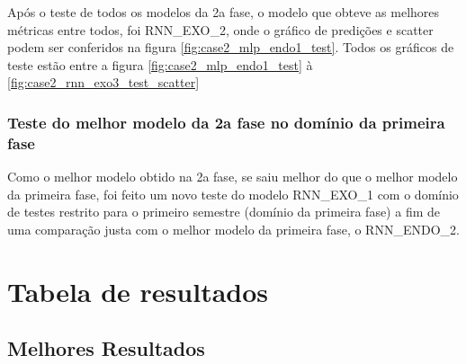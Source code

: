 \documentclass[	12pt, Times, openright, twoside, a4paper, english, brazil]{abntex2}
\begin{document}
            \begin{figure}[H]
            \end{figure}
            \begin{figure}[H]
\end{figure}
    	    Após o teste de todos os modelos da 2a fase, o modelo que obteve as melhores métricas entre todos, foi RNN\_EXO\_2, onde o gráfico de predições e scatter podem ser conferidos na figura \ref{fig:case2_mlp_endo1_test}.
    	    Todos os gráficos de teste estão entre a figura \ref{fig:case2_mlp_endo1_test} à \ref{fig:case2_rnn_exo3_test_scatter}
    	    \subsubsection{Teste do melhor modelo da 2a fase no domínio da primeira fase}
    	        
    	        
    	        Como o melhor modelo obtido na 2a fase, se saiu melhor do que o melhor modelo da primeira fase, foi feito um novo teste do modelo RNN\_EXO\_1 com o domínio de testes restrito para o primeiro semestre (domínio da primeira fase) a fim de uma comparação justa com o melhor modelo da primeira fase, o RNN\_ENDO\_2.
    	        
    
    \section{Tabela de resultados}
        \subsection{Melhores Resultados}
\end{document}
